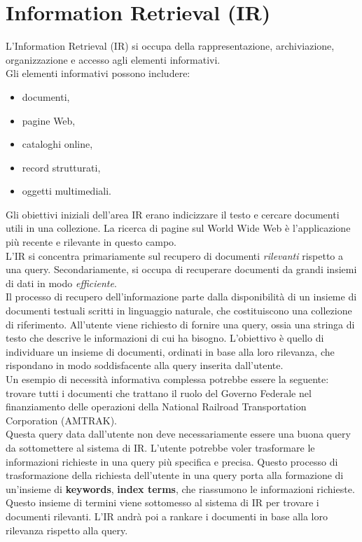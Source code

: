 \documentclass{report}
\begin{document}
	\chapter{Information Retrieval (IR)}
	L'Information Retrieval (IR) si occupa della rappresentazione, archiviazione, organizzazione e accesso agli elementi informativi.
	\vspace{\baselineskip}\\
	Gli elementi informativi possono includere:
	\begin{itemize}
		\item documenti,
		\item pagine Web,
		\item cataloghi online,
		\item record strutturati,
		\item oggetti multimediali.
	\end{itemize}
	Gli obiettivi iniziali dell'area IR erano indicizzare il testo e cercare documenti utili in una collezione. La ricerca di pagine sul World Wide Web è l'applicazione più recente e rilevante in questo campo.
	\vspace{\baselineskip}\\
	L'IR si concentra primariamente sul recupero di documenti \emph{rilevanti} rispetto a una query. Secondariamente, si occupa di recuperare documenti da grandi insiemi di dati in modo \emph{efficiente}.
	\vspace{\baselineskip}\\
	Il processo di recupero dell'informazione parte dalla disponibilità di un insieme di documenti testuali scritti in linguaggio naturale, che costituiscono una collezione di riferimento. All'utente viene richiesto di fornire una query, ossia una stringa di testo che descrive le informazioni di cui ha bisogno. L'obiettivo è quello di individuare un insieme di documenti, ordinati in base alla loro rilevanza, che rispondano in modo soddisfacente alla query inserita dall'utente.
	\vspace{\baselineskip}\\
	Un esempio di necessità informativa complessa potrebbe essere la seguente: trovare tutti i documenti che trattano il ruolo del Governo Federale nel finanziamento delle operazioni della National Railroad Transportation Corporation (AMTRAK).
	\vspace{\baselineskip}\\
	Questa query data dall'utente non deve necessariamente essere una buona query da sottomettere al sistema di IR. L'utente potrebbe voler trasformare le informazioni richieste in una query più specifica e precisa. Questo processo di trasformazione della richiesta dell'utente in una query porta alla formazione di un'insieme di \textbf{keywords}, \textbf{index terms}, che riassumono le informazioni richieste. Questo insieme di termini viene sottomesso al sistema di IR per trovare i documenti rilevanti. L'IR andrà poi a rankare i documenti in base alla loro rilevanza rispetto alla query.
\end{document}

